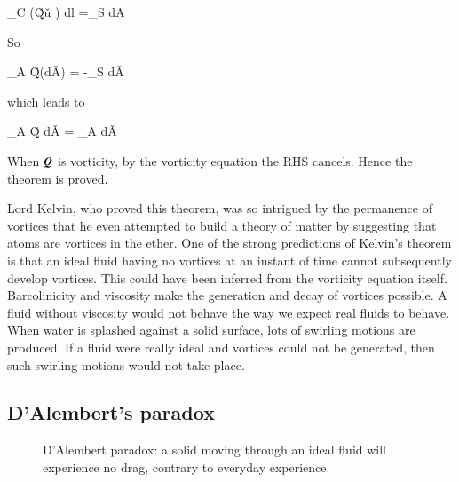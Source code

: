 \beq
\oint_C \left(\v{Q}\times\v{u} \right) dl =\int_S
 dA
\eeq


So 


\beq
\int_A \v{Q}\cdot {}\left(d\v{A}\right) = -\int_S d\v{A}
\eeq

which leads to

\beq
{}\int_A \v{Q} \cdot d\v{A}  = \int_A 
  \cdot d\v{A} 
\eeq

When ${\boldsymbol{Q}}$ is vorticity, by the vorticity equation the RHS
cancels. Hence the theorem is proved.

Lord Kelvin, who proved this theorem, was so intrigued
by the permanence of vortices that he even attempted to build a
theory of matter by suggesting that atoms are vortices in the ether. 
One of the strong predictions of Kelvin's theorem is that an ideal fluid
having no vortices at an instant of time cannot subsequently develop
vortices. This could have been inferred from the vorticity equation
itself. Barcolinicity and viscosity make the generation and decay of
vortices possible. A fluid without viscosity would not behave the way
we expect real fluids to behave. When water is splashed against a solid
surface, lots of swirling motions are produced. If a fluid were really
ideal and vortices could not be generated, then such swirling motions
would not take place.


\subsection{D'Alembert's paradox}

\begin{figure}
  \begin{center}
  \end{center}
  \caption[]{D'Alembert paradox: a solid moving through an ideal fluid will
    experience no drag, contrary to everyday experience.}
  \label{fig:DalembertParadox}
\end{figure}

